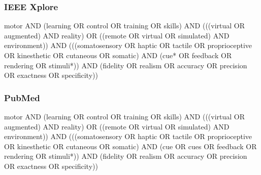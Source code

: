 \documentclass[conference]{IEEEtran}
\begin{document}
\subsubsection{IEEE Xplore}
motor AND (learning OR control OR training OR skills) AND (((virtual OR augmented) AND reality) OR ((remote OR virtual OR simulated) AND environment)) AND (((somatosensory OR haptic OR tactile OR proprioceptive OR kinesthetic OR cutaneous OR somatic) AND (cue* OR feedback OR rendering OR stimuli*)) AND (fidelity OR realism OR accuracy OR precision OR exactness OR specificity)) 

\subsubsection{PubMed}
motor AND (learning OR control OR training OR skills) AND (((virtual OR augmented) AND reality) OR ((remote OR virtual OR simulated) AND environment)) AND (((somatosensory OR haptic OR tactile OR proprioceptive OR kinesthetic OR cutaneous OR somatic) AND (cue OR cues OR feedback OR rendering OR stimuli*)) AND (fidelity OR realism OR accuracy OR precision OR exactness OR specificity))




\end{document}
